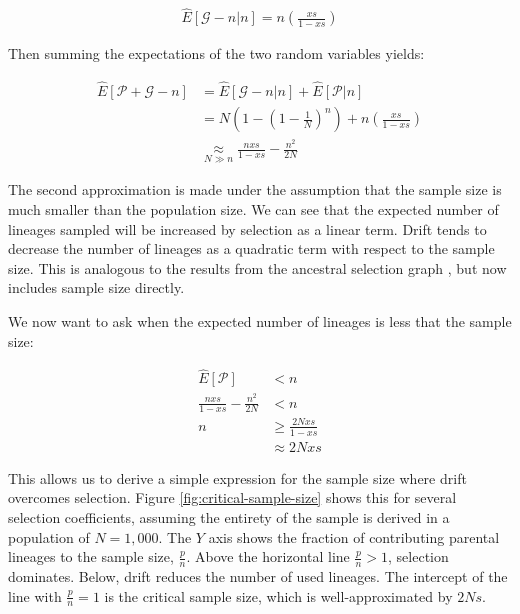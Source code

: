 \documentclass[review]{elsarticle}
\begin{document}
\begin{align}
  \label{eq:neg-binom-fail}
  \hat{E}[\mathcal{G}-n|n] = n\left( \frac{xs}{1-xs}\right)
\end{align}

Then summing the expectations of the two random variables yields:

\begin{align}
  \hat{E}[\mathcal{P}+\mathcal{G}-n] &= \hat{E}[\mathcal{G}-n|n] + \hat{E}[\mathcal{P}|n] \\
  &= N(1-\left( 1 - \frac{1}{N} \right)^n) + n\left( \frac{xs}{1-xs}\right) \\
  &\underset{N\gg n}{\approx} \frac{nxs}{1-xs} - \frac{n^2}{2N}
\end{align}

The second approximation is made under the assumption that the sample size is much smaller than the
population size. We can see that the expected number of lineages sampled will be increased by
selection as a linear term. Drift tends to decrease the number of lineages as a quadratic term with
respect to the sample size. This is analogous to the results from the ancestral selection graph
\cite{KroneNeuhauser1997}, but now includes sample size directly.

We now want to ask when the expected number of lineages is less that the sample size:

\begin{align}
  \label{eq:critical-sample}
  \hat{E}[\mathcal{P}] &< n \nonumber \\
  \frac{nxs}{1-xs} - \frac{n^2}{2N} &< n \\
  n &\ge \frac{2Nxs}{1-xs} \nonumber \\
  &\approx 2Nxs
\end{align}

This allows us to derive a simple expression for the sample size where drift overcomes selection.
Figure \ref{fig:critical-sample-size} shows this for several selection coefficients, assuming the entirety
of the sample is derived in a population of $N=1,000$. The $Y$ axis shows the fraction of
contributing parental lineages to the sample size, $\frac{p}{n}$. Above the horizontal line
$\frac{p}{n} > 1$, selection dominates. Below, drift reduces the number of used lineages. The
intercept of the line with $\frac{p}{n} = 1$ is the critical sample size, which is
well-approximated by $2Ns$.
\end{document}
